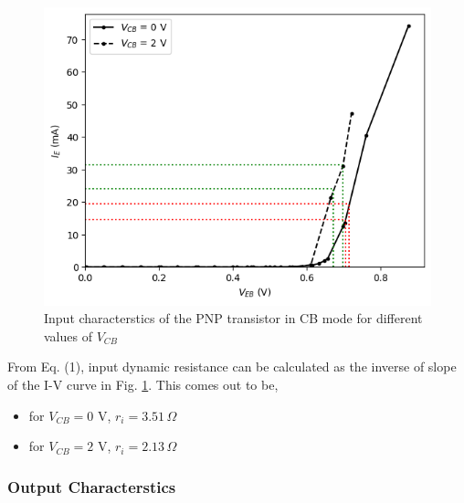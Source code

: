     \begin{figure}[H]
        \centering
        \includegraphics[width=1\columnwidth]{images/g4.png}
        \caption{Input characterstics of the PNP transistor in CB mode for different values of $V_{CB}$}
        \label{graph:4}
    \end{figure}


    From Eq. (1), input dynamic resistance can be calculated as the inverse of slope of the I-V curve in Fig. \ref{graph:4}. This comes out to be, 

    \begin{itemize}
        \item for $V_{CB}=0$ V, $r_i=3.51\,\Omega$ 
        \item for $V_{CB}=2$ V, $r_i=2.13\,\Omega$ 
    \end{itemize}

    \subsubsection*{\textbf{Output Characterstics}} 

